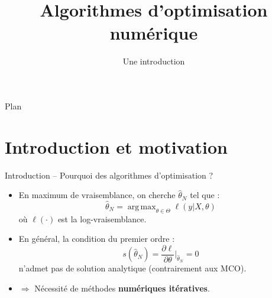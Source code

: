 \documentclass[11pt,aspectratio=169]{beamer}
\title{Algorithmes d'optimisation numérique}
\subtitle{Une introduction}
\author{}
\date{}
\institute{}
\DeclareMathOperator*{\argmax}{arg\,max}
\begin{document}
\begin{frame}
\titlepage
\end{frame}

\begin{frame}{Plan}
\tableofcontents
\end{frame}

\section{Introduction et motivation}

\begin{frame}{Introduction -- Pourquoi des algorithmes d'optimisation ?}

\begin{itemize}

\item En maximum de vraisemblance, on cherche $\hat{\theta}_N$ tel que :
  \[
  \hat{\theta}_N = \argmax_{\theta \in \Theta} \ell(y | X, \theta)
  \]
  où $\ell(\cdot)$ est la log-vraisemblance.\newline

\item En général, la condition du premier ordre :
  \[
  s(\hat{\theta}_N) = \frac{\partial \ell}{\partial \theta}\bigg|_{\hat{\theta}_N} = 0
  \]
  n'admet pas de solution analytique (contrairement aux MCO).\newline

\item $\Rightarrow$ Nécessité de méthodes \textbf{numériques itératives}.

\end{itemize}

\end{frame}
\end{document}
